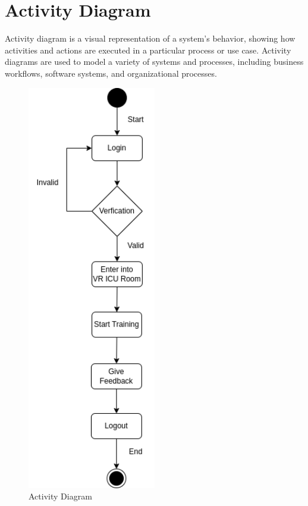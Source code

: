 \section{Activity Diagram}
Activity diagram is a visual representation of a system’s behavior, showing how activities and actions are executed in a particular process or use case. Activity diagrams are used to model a variety of systems and processes, including business workflows, software systems, and organizational processes.
\begin{figure}[h]
    \centering
    \includegraphics[width=0.5\textwidth, height=0.3\textheight]{Images/Activity.drawio.png}
    \caption{Activity Diagram}
    \label{fig:system-diagram}
\end{figure}